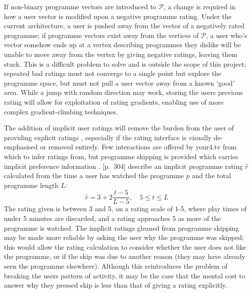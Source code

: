 		If non-binary programme vectors are introduced to $\mathcal{P}$, a change is required in how a user vector is modified upon a negative programme rating. Under the current architecture, a user is pushed away from the vector of a negatively rated programme; if programme vectors exist away from the vertices of $\mathcal{P}$, a user who's vector somehow ends up at a vertex describing programmes they dislike will be unable to move away from the vertex by giving negative ratings, leaving them stuck. This is a difficult problem to solve and is outside the scope of this project; repeated bad ratings must not converge to a single point but explore the programme space, but must not pull a user vector away from a known `good' area. While a jump with random direction may work, storing the users previous rating will allow for exploitation of rating gradients, enabling use of more complex gradient-climbing techniques.

		The addition of implicit user ratings will remove the burden from the user of providing explicit ratings \citep{implicit_indicators}, especially if the rating interface is visually de-emphasised or removed entirely. Few interactions are offered by your4.tv from which to infer ratings from, but programme skipping is provided which carries implicit preference information \cite{exploiting_implicit_feedback}. \citep{recommender-systems-handbook}[p.~304] describe an implicit programme rating $\hat{r}$ calculated from the time a user has watched the programme $p$ and the total programme length $L$:
		$$
			\hat{r} = 3 + 2 \frac{t - 5}{L - 5},\quad 5 \leq t \leq L
		$$
		The rating given is between 3 and 5, on a rating scale of 1-5, where play times of under 5 minutes are discarded, and a rating approaches 5 as more of the programme is watched. The implicit ratings gleaned from programme skipping may be made more reliable by asking the user why the programme was skipped; this would allow the rating calculation to consider whether the user does not like the programme, or if the skip was due to another reason (they may have already seen the programme elsewhere). Although this reintroduces the problem of breaking the users pattern of activity, it may be the case that the mental cost to answer why they pressed skip is less than that of giving a rating explicitly.


